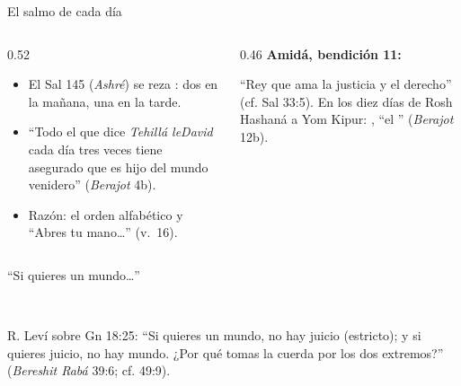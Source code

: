 \begin{frame}{El salmo de cada día}
\begin{columns}[c,onlytextwidth]
\begin{column}{0.52\textwidth}\small
\begin{itemize}
\item El Sal 145 (\emph{Ashré}) se reza : dos en la mañana, una en la tarde.
\item ``Todo el que dice \emph{Tehillá leDavid} cada día tres veces tiene asegurado que es hijo del mundo venidero'' (\emph{Berajot} 4b).
\item Razón: el orden alfabético y ``Abres tu mano\ldots'' (v.~16).
\end{itemize}
\end{column}
\begin{column}{0.46\textwidth}\small
\textbf{\color{azul}Amidá, bendición 11:}
\begin{center}\end{center}
``Rey que ama la justicia y el derecho'' (cf. Sal 33:5). En los diez días de Rosh Hashaná a Yom Kipur: , ``el '' (\emph{Berajot} 12b).
\end{column}
\end{columns}\par\medskip
{}
\end{frame}

\begin{frame}{``Si quieres un mundo\ldots''}
\begin{center}\\[2pt]\end{center}
\small R. Leví sobre Gn 18:25: ``Si quieres un mundo, no hay juicio (estricto); y si quieres juicio, no hay mundo. ¿Por qué tomas la cuerda por los dos extremos?'' (\emph{Bereshit Rabá} 39:6; cf. 49:9).\par\medskip
\centering
{}\par
{}
\end{frame}

